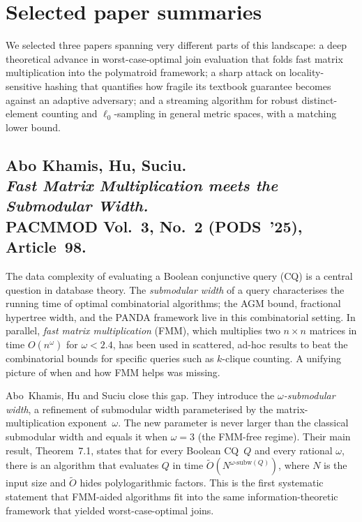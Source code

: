 \documentclass[11pt,a4paper]{article}
\begin{document}
\section{Selected paper summaries}

We selected three papers spanning very different parts of this landscape:
a deep theoretical advance in worst-case-optimal join evaluation that
folds fast matrix multiplication into the polymatroid framework; a sharp
attack on locality-sensitive hashing that quantifies how fragile its
textbook guarantee becomes against an adaptive adversary; and a streaming
algorithm for robust distinct-element counting and $\ell_0$-sampling in
general metric spaces, with a matching lower bound.

\subsection*{Abo Khamis, Hu, Suciu.\\
\emph{Fast Matrix Multiplication meets the Submodular Width.}\\
PACMMOD Vol.~3, No.~2 (PODS~'25), Article~98.}

The data complexity of evaluating a Boolean conjunctive query (CQ) is a
central question in database theory. The \emph{submodular width} of a query
characterises the running time of optimal combinatorial algorithms; the AGM
bound, fractional hypertree width, and the PANDA framework live in this
combinatorial setting. In parallel, \emph{fast matrix multiplication} (FMM),
which multiplies two $n \times n$ matrices in time $O(n^\omega)$ for
$\omega < 2.4$, has been used in scattered, ad-hoc results to beat the
combinatorial bounds for specific queries such as $k$-clique counting. A
unifying picture of when and how FMM helps was missing.

Abo~Khamis, Hu and Suciu close this gap. They introduce the
\emph{$\omega$-submodular width}, a refinement of submodular width
parameterised by the matrix-multiplication exponent~$\omega$. The new
parameter is never larger than the classical submodular width and equals it
when $\omega = 3$ (the FMM-free regime). Their main result, Theorem~7.1,
states that for every Boolean CQ~$Q$ and every rational $\omega$, there is
an algorithm that evaluates $Q$ in time
$\widetilde{O}\!\left(N^{\omega\text{-}\mathrm{subw}(Q)}\right)$, where $N$
is the input size and $\widetilde{O}$ hides polylogarithmic factors. This is
the first systematic statement that FMM-aided algorithms fit into the same
information-theoretic framework that yielded worst-case-optimal joins.
\end{document}
